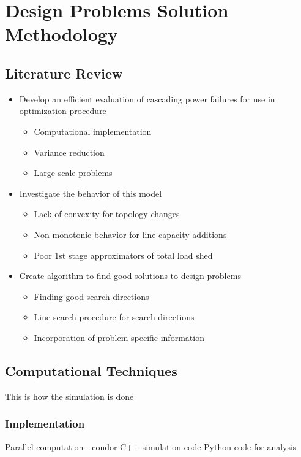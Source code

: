 \newcommand{\mypathdfo}{../thesis/dfo}
\chapter{Design Problems Solution Methodology}


\section{Literature Review}



\begin{itemize}
\item Develop an efficient evaluation of cascading power failures for use in optimization procedure
\begin{itemize}
\item Computational implementation
\item Variance reduction
\item Large scale problems
\end{itemize}
\item Investigate the behavior of this model
\begin{itemize}
\item Lack of convexity for topology changes
\item Non-monotonic behavior for line capacity additions
\item Poor 1st stage approximators of total load shed
\end{itemize}
\item Create algorithm to find good solutions to design problems
\begin{itemize}
\item Finding good search directions
\item Line search procedure for search directions
\item Incorporation of problem specific information
\end{itemize}
\end{itemize}


\section{Computational Techniques}

This is how the simulation is done

\subsection{Implementation}
Parallel computation - condor
C++ simulation code
Python code for analysis

